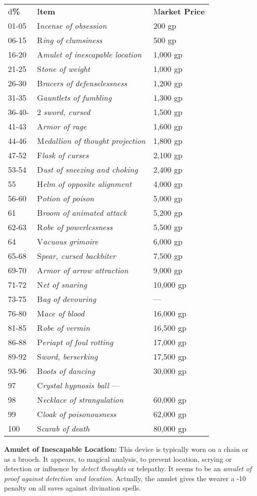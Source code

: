 \documentclass{article}
\begin{document}
\begin{tabular}{|>{\raggedright}p{28pt}|>{\raggedright}p{134pt}|>{\raggedright}p{60pt}|}
\hline
\multicolumn{3}{|p{223pt}|}{T\textbf{able: Specific Cursed Items}}\tabularnewline
\hline
d\textbf{\%} & I\textbf{tem} & M\textbf{arket Price}\tabularnewline
\hline
01-05 & I\textit{ncense of obsession } & 200 gp\tabularnewline
\hline
06-15 & R\textit{ing of clumsiness } & 500 gp\tabularnewline
\hline
16-20 & A\textit{mulet of inescapable location } & 1,000 gp\tabularnewline
\hline
21-25 & S\textit{tone of weight } & 1,000 gp\tabularnewline
\hline
26-30 & B\textit{racers of defenselessness } & 1,200 gp\tabularnewline
\hline
31-35 & G\textit{auntlets of fumbling } & 1,300 gp\tabularnewline
\hline
36-40- & 2\textit{ sword, cursed } & 1,500 gp\tabularnewline
\hline
41-43 & A\textit{rmor of rage } & 1,600 gp\tabularnewline
\hline
44-46 & M\textit{edallion of thought projection } & 1,800 gp\tabularnewline
\hline
47-52 & F\textit{lask of curses } & 2,100 gp\tabularnewline
\hline
53-54 & D\textit{ust of sneezing and choking } & 2,400 gp\tabularnewline
\hline
55 & H\textit{elm of opposite alignment } & 4,000 gp\tabularnewline
\hline
56-60 & P\textit{otion of poison } & 5,000 gp\tabularnewline
\hline
61 & B\textit{room of animated attack } & 5,200 gp\tabularnewline
\hline
62-63 & R\textit{obe of powerlessness } & 5,500 gp\tabularnewline
\hline
64 & V\textit{acuous grimoire } & 6,000 gp\tabularnewline
\hline
65-68 & S\textit{pear, cursed backbiter } & 7,500 gp\tabularnewline
\hline
69-70 & A\textit{rmor of arrow attraction } & 9,000 gp\tabularnewline
\hline
71-72 & N\textit{et of snaring } & 10,000 gp\tabularnewline
\hline
73-75 & B\textit{ag of devouring} &  ---\tabularnewline
\hline
76-80 & M\textit{ace of blood } & 16,000 gp\tabularnewline
\hline
81-85 & R\textit{obe of vermin } & 16,500 gp\tabularnewline
\hline
86-88 & P\textit{eriapt of foul rotting } & 17,000 gp\tabularnewline
\hline
89-92 & S\textit{word, berserking } & 17,500 gp\tabularnewline
\hline
93-96 & B\textit{oots of dancing } & 30,000 gp\tabularnewline
\hline
97 & C\textit{rystal hypnosis ball }--- & \tabularnewline
\hline
98 & N\textit{ecklace of strangulation } & 60,000 gp\tabularnewline
\hline
99 & C\textit{loak of poisonousness } & 62,000 gp\tabularnewline
\hline
100 & S\textit{carab of death} &  80,000 gp\tabularnewline
\hline
\end{tabular}

\vspace{12pt}
\textbf{Amulet of Inescapable Location:} This device is typically worn on a chain 
or as a brooch. It appears, to magical analysis, to prevent location, scrying or 
detection or influence by \textit{detect thoughts }or telepathy. It seems to be 
an \textit{amulet of proof against detection and location}. Actually, the amulet 
gives the wearer a -10 penalty on all saves against divination spells.
\end{document}

